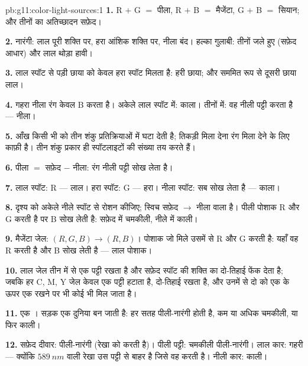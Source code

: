 \begin{solution}{pb:g11:color-light-sources:1}
\textbf{1.} R $+$ G $=$ पीला, R $+$ B $=$ मैजेंटा, G $+$ B
$=$ सियान; और तीनों का अतिच्छादन सफ़ेद।

\textbf{2.} नारंगी: लाल पूरी शक्ति पर, हरा आंशिक शक्ति
पर, नीला बंद। हल्का गुलाबी: तीनों जले हुए (सफ़ेद आधार) और लाल थोड़ा
हावी।

\textbf{3.} लाल स्पॉट से पड़ी छाया को केवल हरा स्पॉट मिलता है: हरी छाया;
और सममित रूप से दूसरी छाया लाल।

\textbf{4.} गहरा नीला रंग केवल B  करता है। अकेले लाल स्पॉट
में: काला। तीनों में: वह नीली पट्टी  करता है --- नीला।

\textbf{5.} आँख किसी भी  को तीन शंकु
प्रतिक्रियाओं में घटा देती है; तिकड़ी मिला देना रंग मिला देने के लिए
काफ़ी है। तीन शंकु प्रकार ही स्पॉटलाइटों की संख्या तय करते हैं।

\textbf{6.} पीला $=$ सफ़ेद $-$ नीला: रंग नीली पट्टी सोख लेता है।

\textbf{7.} लाल स्पॉट: R  --- लाल। हरा स्पॉट: G
 --- हरा। नीला स्पॉट: सब सोख लेता है --- काला।

\textbf{8.} दृश्य को अकेले नीले स्पॉट से रोशन कीजिए; स्विच सफ़ेद $\to$
नीला वाला है। पीली पोशाक R और G  करती है पर B सोख लेती
है: सफ़ेद में चमकीली, नीले में काली।

\textbf{9.} मैजेंटा जेल: $(R, G, B) \to (R, B)$। पोशाक जो मिले उसमें से R और G
 करती है: यहाँ वह R  करती है और B सोख लेती
है --- लाल पोशाक।

\textbf{10.} लाल जेल तीन में से एक पट्टी रखता है और सफ़ेद स्पॉट की
शक्ति का दो-तिहाई फेंक देता है; जबकि हर C, M, Y जेल केवल एक
पट्टी हटाता है, दो-तिहाई रखता है, और उनमें से दो को एक के ऊपर एक रखने पर
भी कोई भी  मिल जाता है।

\textbf{11.} एक । सड़क एक  दुनिया
बन जाती है: हर सतह पीली-नारंगी होती है, कम या अधिक चमकीली, या फिर काली।

\textbf{12.} सफ़ेद दीवार: पीली-नारंगी (रेखा को  करती है)।
पीली पट्टी: चमकीली पीली-नारंगी। लाल कार: गहरी --- क्योंकि $\qty{589}{nm}$ वाली
रेखा उस पट्टी से बाहर है जिसे वह  करती है। नीली कार: काली।


\end{solution}
